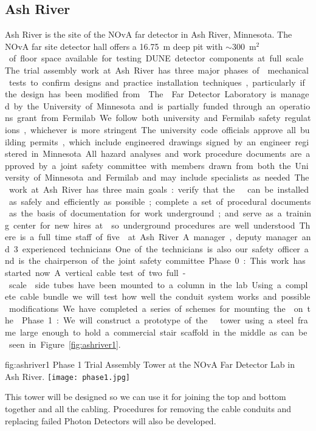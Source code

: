 \subsection{Ash River}

Ash River is the site of the NOvA far detector in Ash River,
Minnesota. The NOvA far site detector hall offers a \SI{16.75}{m} deep
pit with $\sim$\SI{300}{m$^2$} of floor space available for testing
DUNE detector components at full scale.  The trial assembly work at
Ash River has three major phases of  mechanical tests to
confirm designs and practice installation techniques, particularly if
the design has been modified from .  The 
Far Detector Laboratory is managed by the University of Minnesota and
is partially funded through an operations grant from Fermilab.  We follow both
university and Fermilab safety regulations, whichever is more
stringent.  The university code officials approve all building
permits, which include engineered drawings signed by an engineer
registered in Minnesota. All hazard analyses and work procedure
documents are approved by a joint safety committee with members drawn
from both the University of Minnesota and Fermilab and may include
specialists as needed.

The work at Ash River has three main goals: verify that the
  can be installed as safely and efficiently as
possible; complete a set of procedural documents as the basis of
documentation for work underground; and serve as a training center for
new hires at \surf so underground procedures are well understood.

There is a full time staff of five  at Ash River. A manager,
deputy manager and 3 experienced technicians.  One of the technicians
is also our safety officer and is the chairperson of the joint safety
committee.


Phase 0: This work has started now.  A vertical cable test of two
full-scale  side tubes have been mounted to a column in the
lab. Using a complete cable bundle we will test how well the conduit
system works and possible modifications. We have
completed a series of schemes for mounting the 
on the .

Phase 1: We will construct a prototype of the  
tower using a steel frame large enough to hold a commercial stair
scaffold in the middle as can be seen in Figure ~\ref{fig:ashriver1}.
\begin{dunefigure}{fig:ashriver1}
  {Phase 1 Trial Assembly  Tower at the NOvA Far Detector
    Lab in Ash River.}
  \texttt{[image: phase1.jpg]}
\end{dunefigure}
This  tower will be designed so we can
use it for joining the top and bottom  together and all the
cabling. Procedures for removing the cable conduits and replacing
failed Photon Detectors will also be developed.

